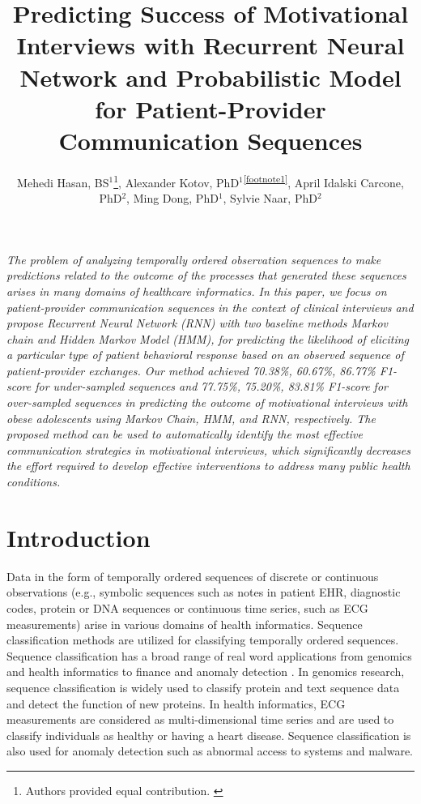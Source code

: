 \documentclass{amia_summit_2018}
\begin{document}
\title{Predicting Success of Motivational Interviews with Recurrent Neural Network and Probabilistic Model for Patient-Provider Communication Sequences}

\author{Mehedi Hasan, BS$^{1}$\footnote[1]{Authors provided equal contribution. \label{footnote1}}, Alexander Kotov, PhD$^{1}$\textsuperscript{\ref{footnote1}}, April Idalski Carcone, PhD$^{2}$, Ming Dong, PhD$^{1}$, Sylvie Naar, PhD$^{2}$}


\maketitle

\textit{The problem of analyzing temporally ordered observation sequences to make predictions related to the outcome of the processes that generated these sequences arises in many domains of healthcare informatics. In this paper, we focus on patient-provider communication sequences in the context of clinical interviews and propose Recurrent Neural Network (RNN) with two baseline methods Markov chain and Hidden Markov Model (HMM), for predicting the likelihood of eliciting a particular type of patient behavioral response based on an observed sequence of patient-provider exchanges. Our method achieved 70.38\%, 60.67\%, 86.77\% F1-score for under-sampled sequences and 77.75\%, 75.20\%, 83.81\% F1-score for over-sampled sequences in predicting the outcome of motivational interviews with obese adolescents using Markov Chain, HMM, and RNN, respectively. The proposed method can be used to automatically identify the most effective communication strategies in motivational interviews, which significantly decreases the effort required to develop effective interventions to address many public health conditions.}

\section*{Introduction}
Data in the form of temporally ordered sequences of discrete or continuous observations (e.g., symbolic sequences such as notes in patient EHR, diagnostic codes, protein or DNA sequences or continuous time series, such as ECG measurements) arise in various domains of health informatics. Sequence classification methods are utilized for classifying temporally ordered sequences. Sequence classification has a broad range of real word applications from genomics and health informatics to finance and anomaly detection \cite{yakhnenko2005discriminatively, wei2006semi, lane1999temporal}. In genomics research, sequence classification is widely used to classify protein and text sequence data and detect the function of new proteins. In health informatics, ECG measurements are considered as multi-dimensional time series and are used to classify individuals as healthy or having a heart disease. Sequence classification is also used for anomaly detection such as abnormal access to systems and malware.
\end{document}
